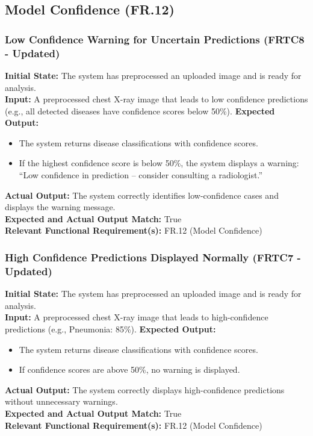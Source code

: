 \documentclass[12pt, titlepage]{article}
\begin{document}
\subsection{Model Confidence (FR.12)}
\subsubsection{Low Confidence Warning for Uncertain Predictions (FRTC8 - Updated)}
\textbf{Initial State:} The system has preprocessed an uploaded image and is ready for analysis.\\
\textbf{Input:} A preprocessed chest X-ray image that leads to low confidence predictions (e.g., all detected diseases have confidence scores below 50\%).
\textbf{Expected Output:}
\begin{itemize}
\item The system returns disease classifications with confidence scores.
\item If the highest confidence score is below 50\%, the system displays a warning: “Low confidence in prediction – consider consulting a radiologist.”
\end{itemize}
\textbf{Actual Output:} The system correctly identifies low-confidence cases and displays the warning message.\\
\textbf{Expected and Actual Output Match:} True\\
\textbf{Relevant Functional Requirement(s):} FR.12 (Model Confidence)\\

\subsubsection{High Confidence Predictions Displayed Normally (FRTC7 - Updated)}
\textbf{Initial State:} The system has preprocessed an uploaded image and is ready for analysis.\\
\textbf{Input:} A preprocessed chest X-ray image that leads to high-confidence predictions (e.g., Pneumonia: 85\%).
\textbf{Expected Output:}
\begin{itemize}
\item The system returns disease classifications with confidence scores.
\item If confidence scores are above 50\%, no warning is displayed.
\end{itemize}
\textbf{Actual Output:} The system correctly displays high-confidence predictions without unnecessary warnings.\\
\textbf{Expected and Actual Output Match:} True\\
\textbf{Relevant Functional Requirement(s):} FR.12 (Model Confidence)\\
\end{document}

